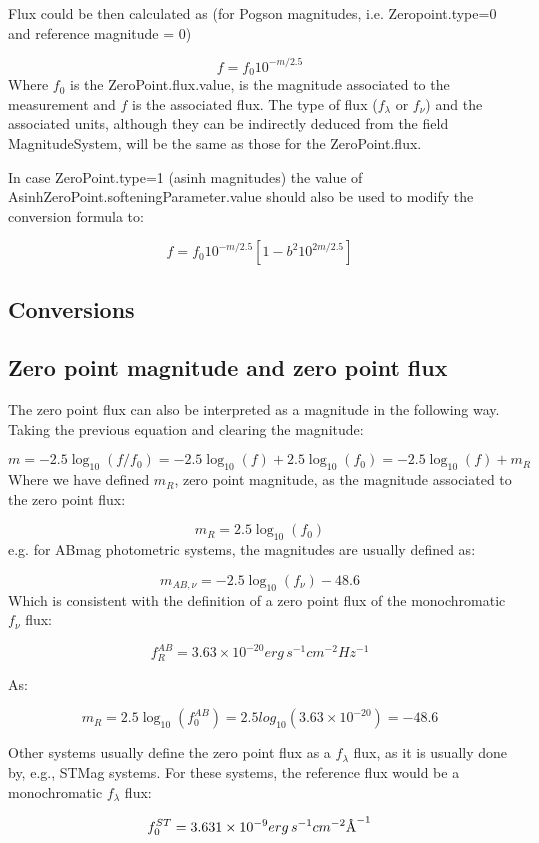 \documentclass[11pt,a4paper]{ivoa}
\newcommand{\angstrom}{\mbox{\normalfont\AA}}
\begin{document}
Flux could be then calculated as (for Pogson magnitudes, i.e. Zeropoint.type=0 and reference magnitude = 0)
\par
\[
f = f_0 10^{-m/2.5}
\]
Where $f_0$ is the ZeroPoint.flux.value, is the magnitude associated to the measurement and $f$ is the associated flux. The type of flux ($f_\lambda $ or $f_\nu $) and the associated units, although they can be indirectly deduced from the field MagnitudeSystem, will be the same as those for the ZeroPoint.flux.
\par
In case ZeroPoint.type=1 (asinh magnitudes) the value of AsinhZeroPoint.softeningParameter.value should also be used to modify the conversion formula to:
\par
\[
f = f_0 10^{-m/2.5}\left[ 1 - b^2 10^{2m/2.5}\right]
\]
\begin{appendices}
\section{Conversions}
\subsection{Zero point magnitude and zero point flux} \label{a.1conversion}
The zero point flux can also be interpreted as a magnitude in the following way. Taking the previous equation and clearing the magnitude:
\par
\[
m=-2.5\log_{10}(f/f_0 )=-2.5\log_{10}(f)+2.5\log_{10}(f_0 )=-2.5\log_{10} (f)+m_R
\]
Where we have defined $m_R$, zero point magnitude, as the magnitude associated to the zero point flux:
\par
\[
m_R = 2.5\log_{10} (f_0 )
\]
e.g. for ABmag photometric systems, the magnitudes are usually defined as:
\par
\[
m_{AB,\nu } = -2.5\log_{10} (f_\nu ) - 48.6
\]
Which is consistent with the definition of a zero point flux of the monochromatic $f_\nu $ flux:
\par
\[
f_{R}^{AB}=3.63 \times 10^{-20} erg\, s^{-1} cm^{-2} Hz^{-1}
\]

As:
\par
\[
m_R = 2.5\log_{10} (f_{0}^{AB})=2.5 log_10(3.63\times 10^{-20})=-48.6
\]

Other systems usually define the zero point flux as a $f_\lambda $ flux, as it is usually done by, e.g., STMag systems. For these systems, the reference flux would be a monochromatic $f_\lambda $ flux:
\par
\[
f_0 ^{ST} = 3.631 \times 10^{-9} erg\, s^{-1} cm^{-2} \angstrom ^{-1}
\]


\end{appendices}
\end{document}
